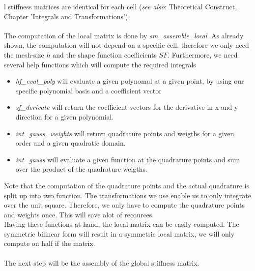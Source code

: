 \documentclass[a4paper,12pt]{article}
\begin{document}
l stiffness matrices are identical for each cell (\textit{see also}: Theoretical Construct, Chapter 'Integrals and Transformations').\\
\\
The computation of the local matrix is done by \textit{sm\_assemble\_local}. As already shown, the computation will not depend on a specific cell, therefore we only need the mesh-size $h$ and the shape function coefficients $SF$. Furthermore, we need several help functions which will compute the required integrals
\begin{itemize}
\item \textit{hf\_eval\_poly} will evaluate a given polynomal at a given point, by using our specific polynomial basis and a coefficient vector
\item \textit{sf\_derivate} will return the coefficient vectors for the derivative in x and y direction for a given polynomial. 
\item \textit{int\_gauss\_weights} will return quadrature points and weigths for a given order and a given quadratic domain.
\item \textit{int\_gauss} will evaluate a given function at the quadrature points and sum over the product of the quadrature weigths. 
\end{itemize} 
Note that the computation of the quadrature points and the actual quadrature is split up into two function. The transformations we use enable us to only integrate over the unit square. Therefore, we only have to compute the quadrature points and weights once. This will save alot of recources.\\
Having these functions at hand, the local matrix can be easily computed. The symmetric bilinear form will result in a symmetric local matrix, we will only compute on half if the matrix.\\
\\
The next step will be the assembly of the global stiffness matrix.
\end{document}
